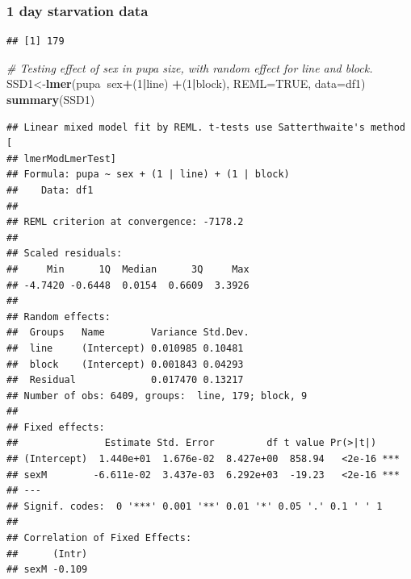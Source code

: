 \documentclass[
]{article}
\newenvironment{Shaded}{\begin{snugshade}}{\end{snugshade}}
\newcommand{\CommentTok}[1]{\textcolor[rgb]{0.56,0.35,0.01}{\textit{#1}}}
\newcommand{\DataTypeTok}[1]{\textcolor[rgb]{0.13,0.29,0.53}{#1}}
\newcommand{\DecValTok}[1]{\textcolor[rgb]{0.00,0.00,0.81}{#1}}
\newcommand{\KeywordTok}[1]{\textcolor[rgb]{0.13,0.29,0.53}{\textbf{#1}}}
\newcommand{\NormalTok}[1]{#1}
\newcommand{\OperatorTok}[1]{\textcolor[rgb]{0.81,0.36,0.00}{\textbf{#1}}}
\newcommand{\OtherTok}[1]{\textcolor[rgb]{0.56,0.35,0.01}{#1}}
\newcommand{\StringTok}[1]{\textcolor[rgb]{0.31,0.60,0.02}{#1}}
\begin{document}
\hypertarget{day-starvation-data}{%
\subsubsection{1 day starvation data}\label{day-starvation-data}}

\begin{Shaded}
\end{Shaded}

\begin{verbatim}
## [1] 179
\end{verbatim}

\begin{Shaded}
\begin{Highlighting}[]
\CommentTok{# Testing effect of sex in pupa size, with random effect for line and block.}
\NormalTok{SSD1<-}\KeywordTok{lmer}\NormalTok{(pupa}\OperatorTok{~}\NormalTok{sex}\OperatorTok{+}\NormalTok{(}\DecValTok{1}\OperatorTok{|}\NormalTok{line) }\OperatorTok{+}\NormalTok{(}\DecValTok{1}\OperatorTok{|}\NormalTok{block), }\DataTypeTok{REML=}\OtherTok{TRUE}\NormalTok{, }\DataTypeTok{data=}\NormalTok{df1)}
\KeywordTok{summary}\NormalTok{(SSD1)}
\end{Highlighting}
\end{Shaded}

\begin{verbatim}
## Linear mixed model fit by REML. t-tests use Satterthwaite's method [
## lmerModLmerTest]
## Formula: pupa ~ sex + (1 | line) + (1 | block)
##    Data: df1
## 
## REML criterion at convergence: -7178.2
## 
## Scaled residuals: 
##     Min      1Q  Median      3Q     Max 
## -4.7420 -0.6448  0.0154  0.6609  3.3926 
## 
## Random effects:
##  Groups   Name        Variance Std.Dev.
##  line     (Intercept) 0.010985 0.10481 
##  block    (Intercept) 0.001843 0.04293 
##  Residual             0.017470 0.13217 
## Number of obs: 6409, groups:  line, 179; block, 9
## 
## Fixed effects:
##               Estimate Std. Error         df t value Pr(>|t|)    
## (Intercept)  1.440e+01  1.676e-02  8.427e+00  858.94   <2e-16 ***
## sexM        -6.611e-02  3.437e-03  6.292e+03  -19.23   <2e-16 ***
## ---
## Signif. codes:  0 '***' 0.001 '**' 0.01 '*' 0.05 '.' 0.1 ' ' 1
## 
## Correlation of Fixed Effects:
##      (Intr)
## sexM -0.109
\end{verbatim}
\end{document}
